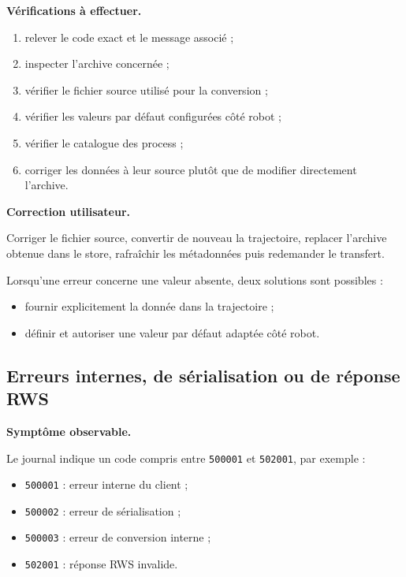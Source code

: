 \documentclass{rapportENSAM}
\begin{document}
\textbf{Vérifications à effectuer.}

\begin{enumerate}
\item relever le code exact et le message associé ;
\item inspecter l'archive concernée ;
\item vérifier le fichier source utilisé pour la conversion ;
\item vérifier les valeurs par défaut configurées côté robot ;
\item vérifier le catalogue des process ;
\item corriger les données à leur source plutôt que de modifier
directement l'archive.
\end{enumerate}

\textbf{Correction utilisateur.}

Corriger le fichier source, convertir de nouveau la trajectoire, replacer
l'archive obtenue dans le store, rafraîchir les métadonnées puis redemander le
transfert.

Lorsqu'une erreur concerne une valeur absente, deux solutions sont possibles :

\begin{itemize}
\item fournir explicitement la donnée dans la trajectoire ;
\item définir et autoriser une valeur par défaut adaptée côté robot.
\end{itemize}

\subsection{Erreurs internes, de sérialisation ou de réponse RWS}
\label{subsec:diagnostic-internal-errors}

\textbf{Symptôme observable.}

Le journal indique un code compris entre \texttt{500001} et
\texttt{502001}, par exemple :

\begin{itemize}
\item \texttt{500001} : erreur interne du client ;
\item \texttt{500002} : erreur de sérialisation ;
\item \texttt{500003} : erreur de conversion interne ;
\item \texttt{502001} : réponse RWS invalide.
\end{itemize}
\end{document}
